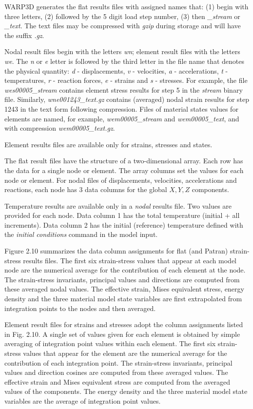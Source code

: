 \documentclass[11pt]{report}
\numberwithin{equation}{section}
\newcommand{\ti}{\emph}
\begin{document}
WARP3D generates the flat results files with assigned names that: (1) begin with three
letters, (2)  followed by the 5 digit load step number, (3) then \ti{\_stream}
or \ti{\_text}.  The text files may be compressed with \ti{gzip} during storage and
will have the suffix \ti{.gz}.

Nodal result files begin with
the letters \ti{wn}; element result files with the letters \ti{we}. The \ti{n} 
or \ti{e} letter is
followed by the third letter in the file name that denotes the physical quantity: \ti{d} -
displacements, \ti{v} - velocities, \ti{a} - accelerations, \ti{t} - temperatures,
\ti{r} - reaction forces, \ti{e} - strains and \ti{s} - stresses. For example, 
the file \ti{wes00005\_stream} contains element
stress results for step 5 in the \ti{stream}  binary file. Similarly, 
\ti{wne001243\_text.gz} contains (averaged) nodal strain
 results for step 1243 in the text form following compression. Files of material states
 values for elements are named, for example, \ti{wem00005\_stream} and 
 \ti{wem00005\_text}, and with compression \ti{wem00005\_text.gz}.

 Element results files are available only for strains, stresses and states.

The flat result files have the structure of a two-dimensional array.
Each row has the data for a single node or element. The array columns set the
values for each node  or element.  For nodal files of displacements, velocities,
accelerations and reactions, each node has 3 data columns for the global
$X, Y, Z$ components. 

Temperature results are available only in a \ti{nodal} results file. Two values are
provided for each node. Data column 1 has the total temperature (initial + all increments).
Data column 2 has the
initial (reference) temperature defined with the \ti{initial conditions} command in
the model input.

Figure 2.10 summarizes the data column assignments for flat (and Patran) strain-stress
results files. The first six strain-stress values that appear at each model node
 are the numerical average for the contribution
of each element at the node. The strain-stress invariants, principal values and
directions are computed from these averaged nodal values. The effective strain,
Mises equivalent stress, energy density and the three material model state
variables are first extrapolated from integration points to the nodes and then
averaged. 

Element result files for strains and stresses adopt the column assignments
listed in Fig. 2.10. A single set of values given for
each element is obtained by simple averaging of integration point values within each
element. The first six strain-stress values that appear for the element are the
numerical average for the contribution of each integration point. The strain-stress
invariants, principal values and direction cosines are computed from these averaged
values. The effective strain and Mises equivalent stress are computed from the
averaged values of the components. The energy density and the three material
model state variables are the average of integration point values.
\end{document}
